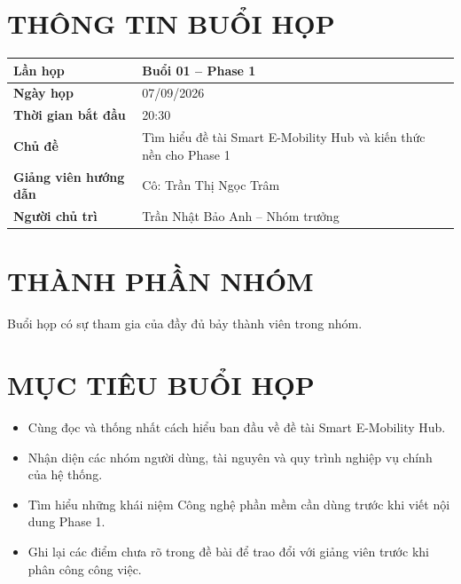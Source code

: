 \documentclass[10pt,a4paper]{article}
\begin{document}
\MakeHCMUTCover

\section{THÔNG TIN BUỔI HỌP}

\begin{table}[htbp]
  \centering
  \begin{tabularx}{\textwidth}{|>{\bfseries}L{45mm}|Y|}
    \hline
    Lần họp & Buổi 01 -- Phase 1\\
    \hline
    Ngày họp & 07/09/2026\\
    \hline
    Thời gian bắt đầu & 20:30\\
    \hline
    Chủ đề & Tìm hiểu đề tài Smart E-Mobility Hub và kiến thức nền cho Phase 1\\
    \hline
    Giảng viên hướng dẫn & Cô: Trần Thị Ngọc Trâm\\
    \hline
    Người chủ trì & Trần Nhật Bảo Anh -- Nhóm trưởng\\
    \hline
  \end{tabularx}
\end{table}

\section{THÀNH PHẦN NHÓM}

\begin{HCMUTMemberTable}
\end{HCMUTMemberTable}

\noindent Buổi họp có sự tham gia của đầy đủ bảy thành viên trong nhóm.

\section{MỤC TIÊU BUỔI HỌP}

\begin{itemize}
  \item Cùng đọc và thống nhất cách hiểu ban đầu về đề tài Smart E-Mobility Hub.
  \item Nhận diện các nhóm người dùng, tài nguyên và quy trình nghiệp vụ chính của hệ thống.
  \item Tìm hiểu những khái niệm Công nghệ phần mềm cần dùng trước khi viết nội dung Phase 1.
  \item Ghi lại các điểm chưa rõ trong đề bài để trao đổi với giảng viên trước khi phân công công việc.
\end{itemize}
\end{document}
